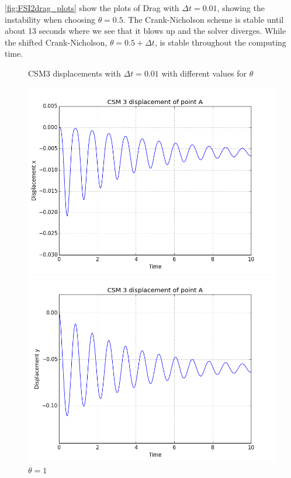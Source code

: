 \ref{fig:FSI2drag_plots} show the plots of Drag with $\Delta t = 0.01$, showing the instability when choosing $\theta = 0.5$. The Crank-Nicholson scheme is stable until about 13 seconds where we see that it blows up and the solver diverges. While the shifted Crank-Nicholson, $\theta = 0.5 + \Delta t$, is stable throughout the computing time.\newline

\begin{figure}[H]  \label{fig:CSM3_dis_plots} 
   \caption {CSM3 displacements with $\Delta t = 0.01$ with different values for $\theta$}
  \begin{minipage}[b]{0.6\linewidth}
    \centering
    \includegraphics[scale=0.40]{./Temporal_stability/CSM3_implicit.png} 
    \caption{$\theta = 1 $} 
    \vspace{4ex}
  \end{minipage}%
  \begin{minipage}[b]{0.6\linewidth}
    \centering
    \includegraphics[scale=0.40]{./Temporal_stability/CSM3_implicit_y.png} 

\end{minipage}
\end{figure}
